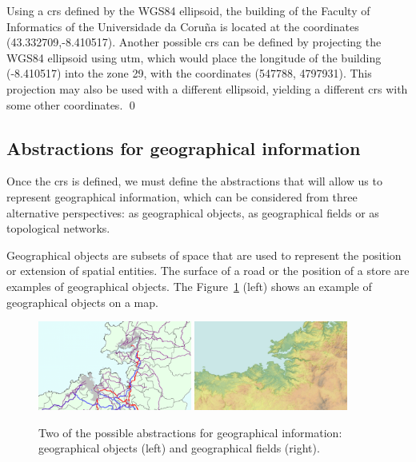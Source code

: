    \begin{example}
    Using a \gls{crs} defined by the WGS84 ellipsoid, the building of the Faculty of Informatics of the Universidade da Coru\~na is located at the coordinates (43.332709,-8.410517).
    Another possible \gls{crs} can be defined by projecting the WGS84 ellipsoid using \gls{utm}, which would place the longitude of the building (-8.410517) into the zone 29, with the coordinates (547788, 4797931). This projection may also be used with a different ellipsoid, yielding a different \gls{crs} with some other coordinates.
    \qed
    \end{example}
    
    \subsection{Abstractions for geographical information}
    Once the \gls{crs} is defined, we must define the abstractions that will allow us to represent geographical information, which can be considered from three alternative perspectives: as geographical objects, as geographical fields or as topological networks.
    
    Geographical objects are subsets of space that are used to represent the position or extension of spatial entities. The surface of a road or the position of a store are examples of geographical objects. The Figure~\ref{fig:gis:concept} (left) shows an example of geographical objects on a map.
    
    \begin{figure}[ht]
		\begin{center}
			{\includegraphics[width=0.45\textwidth]{figures/geo_object.png}}
			{\includegraphics[width=0.45\textwidth]{figures/geo_field.png}}
		\end{center}
		\caption{Two of the possible abstractions for geographical information: geographical objects (left) and geographical fields (right).}
		\label{fig:gis:concept}
	\end{figure}
    
